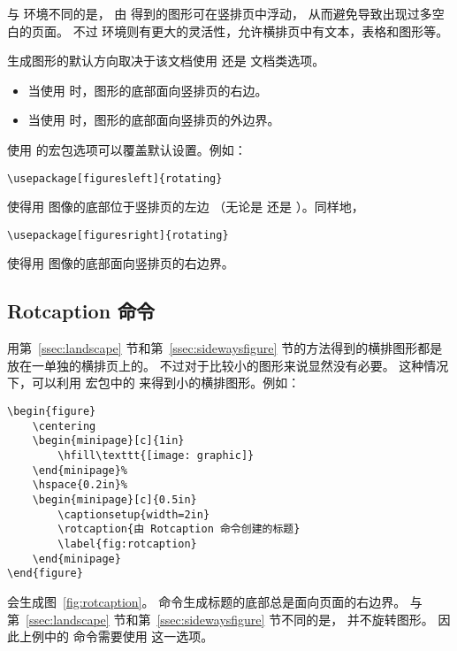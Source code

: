 与  环境不同的是，
由  得到的图形可在竖排页中浮动，
从而避免导致出现过多空白的页面。
不过  环境则有更大的灵活性，允许横排页中有文本，表格和图形等。

 生成图形的默认方向取决于该文档使用  还是  文档类选项。
\begin{itemize}
	\item 当使用  时，图形的底部面向竖排页的右边。
	\item 当使用  时，图形的底部面向竖排页的外边界。
\end{itemize}
使用  的宏包选项可以覆盖默认设置。例如：
\begin{lstlisting}
\usepackage[figuresleft]{rotating}
\end{lstlisting}
使得用  图像的底部位于竖排页的左边
（无论是  还是 ）。同样地，
\begin{lstlisting}
\usepackage[figuresright]{rotating}
\end{lstlisting}
使得用  图像的底部面向竖排页的右边界。

\subsection{Rotcaption 命令}

用第~\ref{ssec:landscape} 节和第~\ref{ssec:sidewaysfigure} 节的方法得到的横排图形都是放在一单独的横排页上的。
不过对于比较小的图形来说显然没有必要。
这种情况下，可以利用  宏包中的  来得到小的横排图形。例如：
\begin{lstlisting}
\begin{figure}
	\centering
	\begin{minipage}[c]{1in}
		\hfill\texttt{[image: graphic]}
	\end{minipage}%
	\hspace{0.2in}%
	\begin{minipage}[c]{0.5in}
		\captionsetup{width=2in}
		\rotcaption{由 Rotcaption 命令创建的标题}
		\label{fig:rotcaption}
	\end{minipage}
\end{figure}
\end{lstlisting}
会生成图~\ref{fig:rotcaption}。
 命令生成标题的底部总是面向页面的右边界。
与第~\ref{ssec:landscape} 节和第~\ref{ssec:sidewaysfigure} 节不同的是，
 并不旋转图形。
因此上例中的  命令需要使用  这一选项。

